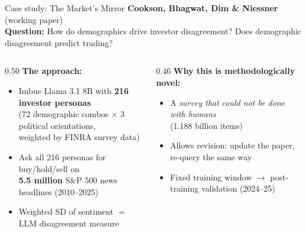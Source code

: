 \documentclass[aspectratio=169, 10pt]{beamer}
\begin{document}
\begin{frame}{Case study: The Market's Mirror}
  \textbf{Cookson, Bhagwat, Dim \& Niessner} (working paper)\\[0.5em]

  \textbf{Question:} How do demographics drive investor disagreement?
  Does demographic disagreement predict trading?

  \vspace{0.5em}
  \begin{columns}[T]
    \begin{column}{0.50\textwidth}
      \textbf{The approach:}
      \begin{itemize}
        \small
        \item Imbue Llama 3.1 8B with \textbf{216 investor personas}\\
              (72 demographic combos $\times$ 3 political orientations,\\
              weighted by FINRA survey data)
        \item Ask all 216 personas for buy/hold/sell on\\
              \textbf{5.5 million} S\&P 500 news headlines (2010--2025)
        \item Weighted SD of sentiment $=$ LLM disagreement measure
      \end{itemize}
    \end{column}
    \begin{column}{0.46\textwidth}
      \textbf{Why this is methodologically novel:}
      \begin{itemize}
        \small
        \item A \textit{survey that could not be done with humans}\\
              (1.188 billion items)
        \item Allows revision: update the paper, re-query the same way
        \item Fixed training window $\to$ post-training validation (2024--25)
      \end{itemize}
    \end{column}
  \end{columns}
\end{frame}
\end{document}
